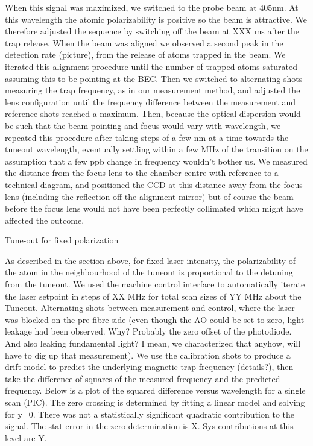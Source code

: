 	When this signal was maximized, we switched
to the probe beam at 405nm.
	At this wavelength the atomic polarizability
is positive so the beam is attractive.
	We therefore adjusted the
sequence by switching off the beam at XXX ms after the trap release.
When the beam was aligned we observed a second peak in the detection
rate (picture), from the release of atoms trapped in the beam.
	We
iterated this alignment procedure until the number of trapped atoms
saturated - assuming this to be pointing at the BEC.
	Then we switched to
alternating shots measuring the trap frequency, as in our measurement
method, and adjusted the lens configuration until the frequency
difference between the measurement and reference shots reached a
maximum.
	Then, because the optical dispersion would be such that the
beam pointing and focus would vary with wavelength, we repeated this
procedure after taking steps of a few nm at a time towards the tuneout
wavelength, eventually settling within a few MHz of the transition on
the assumption that a few ppb change in frequency wouldn't bother us.
	We
measured the distance from the focus lens to the chamber centre with
reference to a technical diagram, and positioned the CCD at this
distance away from the focus lens (including the reflection off the
alignment mirror) but of course the beam before the focus lens would not
have been perfectly collimated which might have affected the outcome.

Tune-out for fixed polarization


As described in the section above, for fixed laser intensity, the polarizability of the atom in the neighbourhood of the tuneout is proportional to the detuning from the tuneout.
	We used the machine control interface to automatically iterate the laser setpoint in steps of XX MHz for total scan sizes of YY MHz about the Tuneout.
	Alternating shots between measurement and control, where the laser was blocked on the pre-fibre side (even though the AO could be set to zero, light leakage had been observed.
	Why? Probably the zero offset of the photodiode.
	And also leaking fundamental light? I mean, we characterized that anyhow, will have to dig up that measurement).
	We use the calibration shots to produce a drift model to predict the underlying magnetic trap frequency (details?), then take the difference of squares of the measured frequency and the predicted frequency.
	Below is a plot of the squared difference versus wavelength for a single scan (PIC).
	The zero crossing is determined by fitting a linear model and solving for y=0.
	There was not a statistically significant quadratic contribution to the signal.
	The stat error in the zero determination is X.
	Sys contributions at this level are Y.

